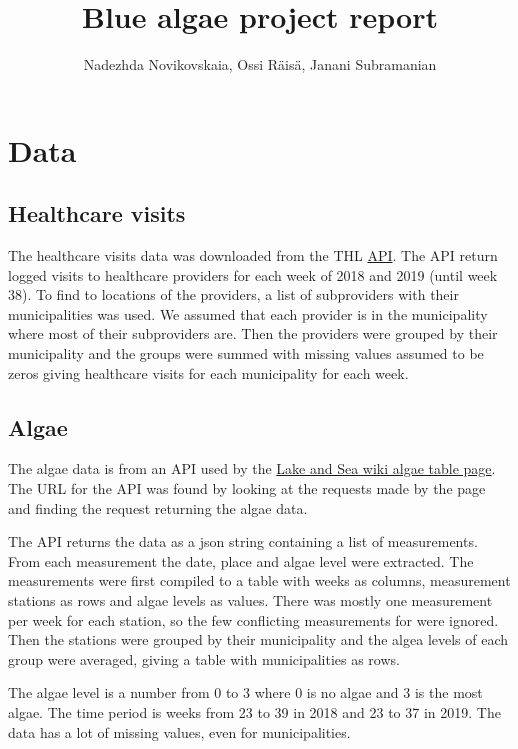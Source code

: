 \documentclass[a4paper, 12pt, english]{article}
\title{Blue algae project report}
\author{Nadezhda Novikovskaia, Ossi Räisä, Janani Subramanian}
\begin{document}
\maketitle

\section{Data}

\subsection{Healthcare visits}
The healthcare visits data was downloaded from
the THL
\href{https://sampo.thl.fi/pivot/prod/fi/avopika/pikarap01/fact_ahil_pikarap01.csv?row=palveluntuottaja-349235L&column=viikko-349531L}{API}.
The API return logged visits to healthcare providers for each week
of 2018 and 2019 (until week 38). To find to locations of the providers,
a list of subproviders with their municipalities was used. We assumed
that each provider is in the municipality where most of their
subproviders are. Then the providers were grouped by their municipality
and the groups were summed with missing values assumed to be zeros
giving healthcare visits for each municipality for each week.

\subsection{Algae}
The algae data is from an API used by the
\href{https://www.jarviwiki.fi/wiki/Toiminnot:Semanttinen_kysely/Lev%C3%A4taulukko}
{Lake and Sea wiki algae table page}.
The URL for the API was found by looking at the requests made by
the page and finding the request returning the algae data.

The API returns the data as a json string containing a list of
measurements. From each measurement the date, place and algae level were
extracted. The measurements were first compiled to a table with weeks
as columns, measurement stations as rows and algae levels as values.
There was mostly one measurement per week for each station, so the
few conflicting measurements for were ignored. Then the stations
were grouped by their municipality and the algea levels of each group
were averaged, giving a table with municipalities as rows.

The algae level is a number from 0 to 3 where 0 is no algae
and 3 is the most algae. The time period is weeks from 23 to 39
in 2018 and 23 to 37 in 2019.
The data has a lot of missing values, even for municipalities.
\end{document}
